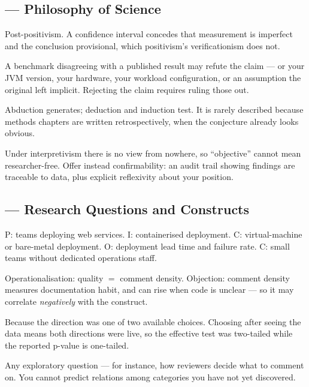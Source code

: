 \subsection*{ --- Philosophy of Science}
\begin{tightnum}
  \item Post-positivism. A confidence interval concedes that measurement is
    imperfect and the conclusion provisional, which positivism's verificationism
    does not.
  \item A benchmark disagreeing with a published result may refute the claim
    --- or your JVM version, your hardware, your workload configuration, or an
    assumption the original left implicit. Rejecting the claim requires ruling
    those out.
  \item Abduction generates; deduction and induction test. It is rarely
    described because methods chapters are written retrospectively, when the
    conjecture already looks obvious.
  \item Under interpretivism there is no view from nowhere, so ``objective''
    cannot mean researcher-free. Offer instead confirmability: an audit trail
    showing findings are traceable to data, plus explicit reflexivity about
    your position.
\end{tightnum}

\subsection*{ --- Research Questions and Constructs}
\begin{tightnum}
  \item P: teams deploying web services. I: containerised deployment.
    C: virtual-machine or bare-metal deployment. O: deployment lead time and
    failure rate. C: small teams without dedicated operations staff.
  \item Operationalisation: quality $=$ comment density. Objection: comment
    density measures documentation habit, and can rise when code is unclear ---
    so it may correlate \emph{negatively} with the construct.
  \item Because the direction was one of two available choices. Choosing after
    seeing the data means both directions were live, so the effective test was
    two-tailed while the reported p-value is one-tailed.
  \item Any exploratory question --- for instance, how reviewers decide what to
    comment on. You cannot predict relations among categories you have not yet
    discovered.
\end{tightnum}

